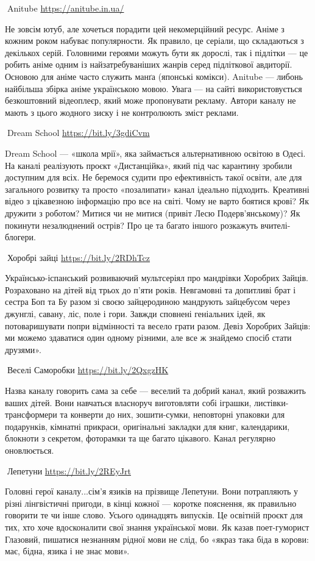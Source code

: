 🦉Anitube \url{https://anitube.in.ua/}

Не зовсім ютуб, але хочеться порадити цей некомерційний ресурс. Аніме з кожним
роком набуває популярности. Як правило, це серіали, що складаються з декількох
серій. Головними героями можуть бути як дорослі, так і підлітки — це робить
аніме одним із найзатребуваніших жанрів серед підліткової авдиторії. Основою
для аніме часто служить манґа (японські комікси). Anitube — либонь найбільша
збірка аніме українською мовою. Увага — на сайті використовується безкоштовний
відеоплеєр, який може пропонувати рекламу. Автори каналу не мають з цього
жодного зиску і не контролюють зміст реклами.

🦉Dream School \url{https://bit.ly/3gdiCvm}

Dream School — «школа мрії», яка займається альтернативною освітою в Одесі. На каналі реалізують проєкт «Дистанційка», який під час карантину зробили доступним для всіх. Не беремося судити про ефективність такої освіти, але для загального розвитку та просто «позалипати» канал ідеально підходить. Креативні відео з цікавезною інформацію про все на світі. Чому не варто боятися крові? Як дружити з роботом? Митися чи не митися (привіт Лесю Подерв’янському)? Як покинути незалюднений острів? Про це та багато іншого розкажуть вчителі-блогери.

🦉Хоробрі зайці \url{https://bit.ly/2RDhTcz}

Українсько-іспанський розвиваючий мультсеріял про мандрівки Хоробрих Зайців. Розраховано на дітей від трьох до п’яти років. Невгамовні та допитливі брат і сестра Боп та Бу разом зі своєю зайцеродиною мандрують зайцебусом через джунглі, савану, ліс, поле і гори. Завжди сповнені геніальних ідей, як потоваришувати попри відмінності та весело грати разом. Девіз Хоробрих Зайців: ми можемо здаватися один одному різними, але все ж знайдемо спосіб стати друзями».

🦉Веселі Саморобки \url{https://bit.ly/2QxgzHK}

Назва каналу говорить сама за себе — веселий та добрий канал, який розважить ваших дітей. Вони навчаться власноруч виготовляти собі іграшки, листівки-трансформери та конверти до них, зошити-сумки, неповторні упаковки для подарунків, кімнатні прикраси, оригінальні закладки для книг, календарики, блокноти з секретом, фоторамки та ще багато цікавого. Канал регулярно оновлюється.

🦉Лепетуни \url{https://bit.ly/2REyJrt}

Головні герої каналу...сім’я язиків на прізвище Лепетуни. Вони потрапляють у різні лінгвістичні пригоди, в кінці кожної — коротке пояснення, як правильно говорити те чи інше слово. Усього одинадцять випусків. Це освітній проєкт для тих, хто хоче вдосконалити свої знання української мови. Як казав поет-гуморист Глазовий, пишатися незнанням рідної мови не слід, бо «якраз така біда в корови: має, бідна, язика і не знає мови».

